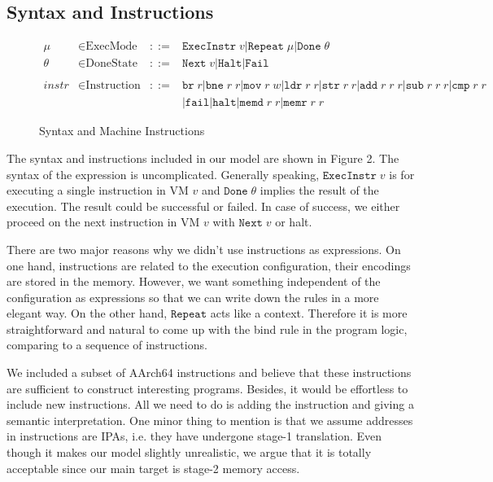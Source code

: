 \documentclass[a4paper]{article}
\newcommand*{\derived}{::=}
\newcommand*{\MODE}{\text{ExecMode}}
\newcommand*{\DONE}{\text{DoneState}}
\newcommand*{\INSTR}{\text{Instruction}}
\newcommand*{\instrm}[1]{\mathtt{#1}}
\newcommand*{\EI}[1]{\mathtt{ExecInstr} \; {#1}}
\newcommand*{\DN}[1]{\mathtt{Done} \; {#1}}
\newcommand*{\NXT}[1]{\mathtt{Next} \; {#1}}
\begin{document}
\subsection{Syntax and Instructions}
\begin{figure}[h!]
  \begin{align*}
    \mu &\in \MODE &\derived & \mathtt{ExecInstr} \; v | \mathtt{Repeat} \; \mu | \mathtt{Done} \; \theta \\
    \theta &\in \DONE &\derived & \NXT{v} | \mathtt{Halt} | \mathtt{Fail}\\
    \\
    instr & \in  \INSTR &\derived & \instrm{br} \; r |\instrm{bne} \; r \; r |
                                    \instrm{mov} \; r \; w | \instrm{ldr} \; r\; r|
                                    \instrm{str} \; r \; r | \instrm{add} \; r \; r \; r |
                                    \instrm{sub} \; r \; r \; r | \instrm{cmp} \; r \; r \\
        & & & | \instrm{fail} | \instrm{halt} | \instrm{memd} \; r \; r | \instrm{memr} \; r\; r
  \end{align*}
  \caption{Syntax and Machine Instructions}
\end{figure}

The syntax and instructions included in our model are shown in Figure 2. The
syntax of the expression is uncomplicated. Generally speaking, $\EI{v}$ is for
executing a single instruction in VM $v$ and $\DN{\theta}$ implies the result of
the execution. The result could be successful or failed. In case of success, we
either proceed on the next instruction in VM $v$ with $\NXT{v}$ or halt.

There are two major reasons why we didn't use instructions as expressions. On
one hand,
instructions are related to the execution configuration, their encodings are
stored in the memory. However, we want something independent of the
configuration as expressions so that we can write down the rules in a more
elegant way. On the other hand, $\mathtt{Repeat}$ acts like a context.
Therefore it is more straightforward and natural to come up with the bind rule
in the program logic, comparing to a sequence of instructions.


We included a subset of AArch64 instructions and believe that these instructions
are sufficient to construct interesting programs. Besides, it would be
effortless to include new instructions. All we need to do is adding the
instruction and giving a semantic interpretation. One minor thing to mention is
that we assume addresses in instructions are IPAs, i.e. they have undergone
stage-1 translation. Even though it makes our model slightly unrealistic, we argue
that it is totally acceptable since our main target is stage-2 memory access.
\end{document}
